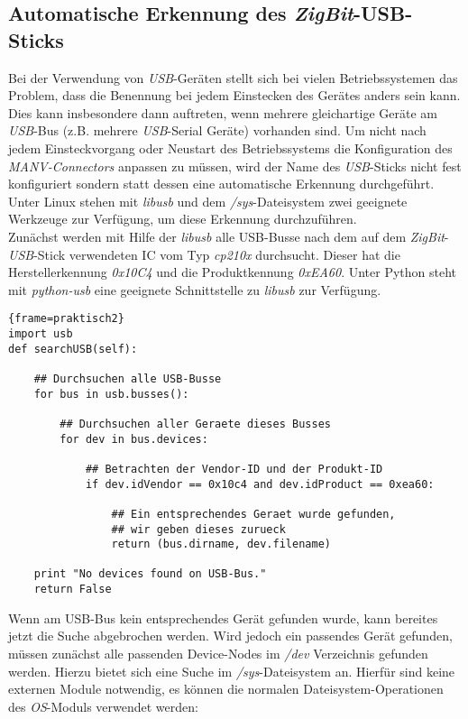 \subsection{Automatische Erkennung des \emph{ZigBit}-USB-Sticks}\label{usb_stick_erkennen}

Bei der Verwendung von \emph{USB}-Geräten stellt sich bei vielen Betriebssystemen das Problem,
dass die Benennung bei jedem Einstecken des Gerätes anders sein kann. Dies kann insbesondere
dann auftreten, wenn mehrere gleichartige Geräte am \emph{USB}-Bus (z.B. mehrere \emph{USB}-Serial
Geräte) vorhanden sind. Um nicht nach jedem Einsteckvorgang oder Neustart des Betriebssystems die
Konfiguration des \emph{MANV-Connectors} anpassen zu müssen, wird der Name des \emph{USB}-Sticks
nicht fest konfiguriert sondern statt dessen eine automatische Erkennung durchgeführt.
Unter Linux stehen mit \emph{libusb} und dem \emph{/sys}-Dateisystem zwei geeignete Werkzeuge
zur Verfügung, um diese Erkennung durchzuführen.\\
Zunächst werden mit Hilfe der \emph{libusb} alle USB-Busse nach dem auf dem \emph{ZigBit}-\emph{USB}-Stick
verwendeten IC vom Typ \emph{cp210x} durchsucht. Dieser hat die Herstellerkennung \emph{0x10C4} und die
Produktkennung \emph{0xEA60}. Unter Python steht mit \emph{python-usb} eine geeignete Schnittstelle zu
\emph{libusb} zur Verfügung.

\begin{lstlisting}{frame=praktisch2}
import usb
def searchUSB(self):

    ## Durchsuchen alle USB-Busse 
    for bus in usb.busses():

        ## Durchsuchen aller Geraete dieses Busses
        for dev in bus.devices:

            ## Betrachten der Vendor-ID und der Produkt-ID
            if dev.idVendor == 0x10c4 and dev.idProduct == 0xea60:
               
                ## Ein entsprechendes Geraet wurde gefunden,
                ## wir geben dieses zurueck 
                return (bus.dirname, dev.filename)
   
    print "No devices found on USB-Bus."
    return False
\end{lstlisting}

Wenn am USB-Bus kein entsprechendes Gerät gefunden wurde, kann bereites jetzt die Suche abgebrochen werden.
Wird jedoch ein passendes Gerät gefunden, müssen zunächst alle passenden Device-Nodes im \emph{/dev} 
Verzeichnis gefunden werden. Hierzu bietet sich eine Suche im \emph{/sys}-Dateisystem an. Hierfür sind keine
externen Module notwendig, es können die normalen Dateisystem-Operationen des \emph{OS}-Moduls verwendet werden:

